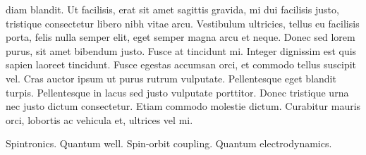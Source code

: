 \begin{resumo}
  diam blandit. Ut facilisis, erat sit amet sagittis gravida, mi dui
  facilisis justo, tristique consectetur libero nibh vitae
  arcu. Vestibulum ultricies, tellus eu facilisis porta, felis nulla
  semper elit, eget semper magna arcu et neque. Donec sed lorem purus,
  sit amet bibendum justo. Fusce at tincidunt mi. Integer dignissim
  est quis sapien laoreet tincidunt. Fusce egestas accumsan orci, et
  commodo tellus suscipit vel. Cras auctor ipsum ut purus rutrum
  vulputate. Pellentesque eget blandit turpis. Pellentesque in lacus
  sed justo vulputate porttitor. Donec tristique urna nec justo dictum
  consectetur. Etiam commodo molestie dictum. Curabitur mauris orci,
  lobortis ac vehicula et, ultrices vel mi.
\end{resumo}

\begin{keywords}
	Spintronics. Quantum well. Spin-orbit coupling. Quantum electrodynamics.
\end{keywords}
